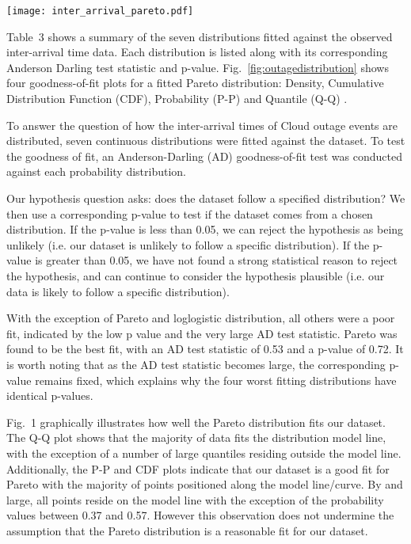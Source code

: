\documentclass[5p]{elsarticle}
\begin{document}
\begin{figure*}[]
\begin{center}
\texttt{[image: inter\_arrival\_pareto.pdf]} 
\end{center}
\caption{Density, CDF, P-P and Q-Q plots for a fitted Pareto Distribution against inter-arrival time data}
\label{fig:outagedistribution}
\end{figure*}

Table~3 shows a summary of the seven distributions fitted against the observed inter-arrival time data. Each distribution is listed along with its corresponding Anderson Darling test statistic and p-value. Fig.~\ref{fig:outagedistribution} shows four goodness-of-fit plots for a fitted Pareto distribution: Density, Cumulative Distribution Function (CDF), Probability (P-P) \cite{gibbons2011nonparametric}  and Quantile (Q-Q) \cite{wilk1968probability}.  


To answer the question of how the inter-arrival times of Cloud outage events are distributed, seven continuous distributions were fitted against the dataset. To test the goodness of fit, an Anderson-Darling (AD) goodness-of-fit test was conducted against each probability distribution. 

Our hypothesis question asks: does the dataset follow a specified distribution? We then use a corresponding p-value to test if the dataset comes from a chosen distribution. If the p-value is less than 0.05, we can reject the hypothesis as being unlikely (i.e. our dataset is unlikely to follow a specific distribution). If the p-value is greater than 0.05, we have not found a strong statistical reason to reject the hypothesis, and can continue to consider the hypothesis plausible (i.e. our data is likely to follow a specific distribution). 


With the exception of Pareto and loglogistic distribution, all others were a poor fit, indicated by the low p value and the very large AD test statistic. Pareto was found to be the best fit, with an AD test statistic of 0.53 and a p-value of 0.72. It is worth noting that as the AD test statistic becomes large, the corresponding p-value remains fixed, which explains why the four worst fitting distributions have identical p-values.

Fig.~1 graphically illustrates how well the Pareto distribution fits our dataset. The Q-Q plot shows that the majority of data fits the distribution model line, with the exception of a number of large quantiles residing outside the model line. Additionally, the P-P and CDF plots indicate that our dataset is a good fit for Pareto with the majority of points positioned along the model line/curve. By and large, all points reside on the model line with the exception of the probability values between 0.37 and 0.57. However this observation does not undermine the assumption that the Pareto distribution is a reasonable fit for our dataset. 
\end{document}
